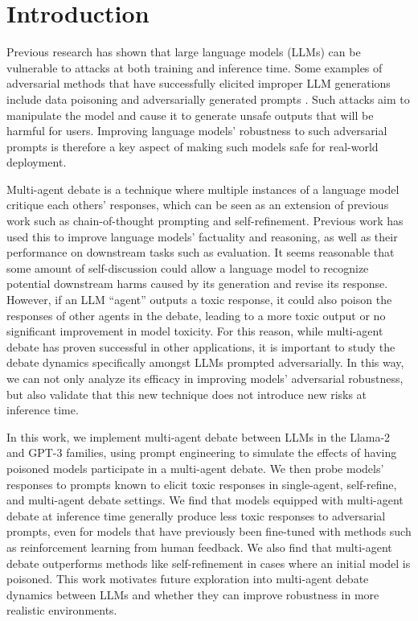 
\section{Introduction}

Previous research has shown that large language models (LLMs) can be vulnerable to attacks at both training and inference time. Some examples of adversarial methods that have successfully elicited improper LLM generations include data poisoning \citep{du2022ppt} and adversarially generated prompts \citep{zou2023universal_adv_attacks}. Such attacks aim to manipulate the model and cause it to generate unsafe outputs that will be harmful for users. Improving language models' robustness to such adversarial prompts is therefore a key aspect of making such models safe for real-world deployment.

Multi-agent debate is a technique where multiple instances of a language model critique each others' responses, which can be seen as an extension of previous work such as chain-of-thought prompting and self-refinement. Previous work has used this to improve language models' factuality and reasoning, as well as their performance on downstream tasks such as evaluation. It seems reasonable that some amount of self-discussion could allow a language model to recognize potential downstream harms caused by its generation and revise its response. However, if an LLM ``agent'' outputs a toxic response, it could also poison the responses of other agents in the debate, leading to a more toxic output or no significant improvement in model toxicity. For this reason, while multi-agent debate has proven successful in other applications, it is important to study the debate dynamics specifically amongst LLMs prompted adversarially. In this way, we can not only analyze its efficacy in improving models' adversarial robustness, but also validate that this new technique does not introduce new risks at inference time.

In this work, we implement multi-agent debate between LLMs in the Llama-2 and GPT-3 families, using prompt engineering to simulate the effects of having poisoned models participate in a multi-agent debate. We then probe models' responses to prompts known to elicit toxic responses in single-agent, self-refine, and multi-agent debate settings. We find that models equipped with multi-agent debate at inference time generally produce less toxic responses to adversarial prompts, even for models that have previously been fine-tuned with methods such as reinforcement learning from human feedback. We also find that multi-agent debate outperforms methods like self-refinement in cases where an initial model is poisoned. This work motivates future exploration into multi-agent debate dynamics between LLMs and whether they can improve robustness in more realistic environments.
